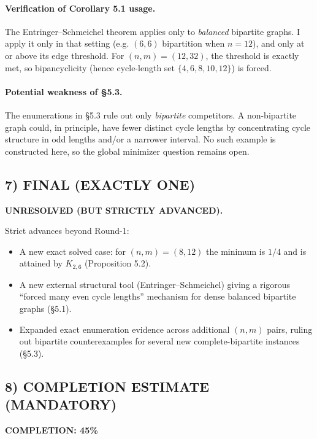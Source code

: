 \paragraph{Verification of Corollary 5.1 usage.}
The Entringer--Schmeichel theorem applies only to \emph{balanced} bipartite graphs.
I apply it only in that setting (e.g. $(6,6)$ bipartition when $n=12$), and only at or above its edge threshold.
For $(n,m)=(12,32)$, the threshold is exactly met, so bipancyclicity (hence cycle-length set $\{4,6,8,10,12\}$) is forced.

\paragraph{Potential weakness of \S5.3.}
The enumerations in \S5.3 rule out only \emph{bipartite} competitors.
A non-bipartite graph could, in principle, have fewer distinct cycle lengths by concentrating cycle structure in odd lengths and/or a narrower interval.
No such example is constructed here, so the global minimizer question remains open.

\subsection*{7) \textbf{FINAL (EXACTLY ONE)}}
\textbf{UNRESOLVED (BUT STRICTLY ADVANCED).}

Strict advances beyond Round-1:
\begin{itemize}
\item A new exact solved case: for $(n,m)=(8,12)$ the minimum is $1/4$ and is attained by $K_{2,6}$ (Proposition 5.2).
\item A new external structural tool (Entringer--Schmeichel) giving a rigorous ``forced many even cycle lengths'' mechanism for dense balanced bipartite graphs (\S5.1).
\item Expanded exact enumeration evidence across additional $(n,m)$ pairs, ruling out bipartite counterexamples for several new complete-bipartite instances (\S5.3).
\end{itemize}

\subsection*{8) \textbf{COMPLETION ESTIMATE (MANDATORY)}}
\textbf{COMPLETION: 45\%}

